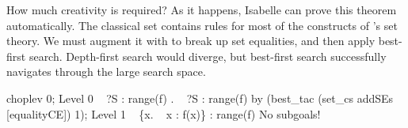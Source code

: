 How much creativity is required?  As it happens, Isabelle can prove this
theorem automatically.  The classical set  contains rules
for most of the constructs of \HOL's set theory.  We must augment it with
 to break up set equalities, and then apply best-first
search.  Depth-first search would diverge, but best-first search
successfully navigates through the large search space.
\begin{ttbox}
choplev 0;
{\out Level 0}
{\out ~ ?S : range(f)}
{. ~ ?S : range(f)}
\ttbreak
by (best_tac (set_cs addSEs [equalityCE]) 1);
{\out Level 1}
{\out ~ \{x. ~ x : f(x)\} : range(f)}
{\out No subgoals!}
\end{ttbox}

